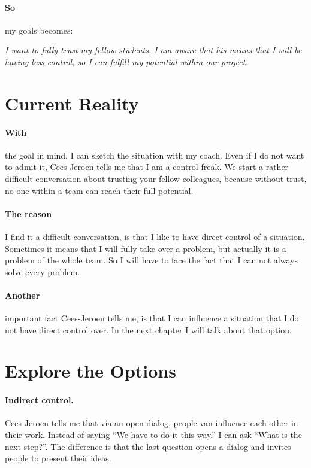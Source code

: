 \documentclass[11pt]{article}
\begin{document}
	\paragraph{So} my goals becomes: 
	
	\textit{I want to fully trust my fellow students. I am aware that his means that I will be having less control, so I can fulfill my potential within our project.}
	
	\section{Current Reality}\label{sec:CR}
	\paragraph{With} the goal in mind, I can sketch the situation with my coach. Even if I do not want to admit it, Cees-Jeroen tells me that I am a control freak. We start a rather difficult conversation about trusting your fellow colleagues, because without trust, no one within a team can reach their full potential.
	
	\paragraph{The reason} I find it a difficult conversation, is that I like to have direct control of a situation. Sometimes it means that I will fully take over a problem, but actually it is a problem of the whole team. So I will have to face the fact that I can not always solve every problem.
	
	\paragraph{Another} important fact Cees-Jeroen tells me, is that I can influence a situation that I do not have direct control over. In the next chapter I will talk about that option. 
	
	\section{Explore the Options}\label{sec:Options}
	\paragraph{Indirect control.} Cees-Jeroen tells me that via an open dialog, people van influence each other in their work. Instead of saying ``We have to do it this way.'' I can ask ``What is the next step?''. The difference is that the last question opens a dialog and invites people to present their ideas.
	
\end{document}
